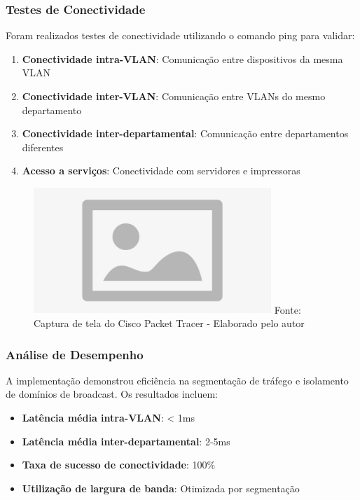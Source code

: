 \subsubsection{Testes de Conectividade}

Foram realizados testes de conectividade utilizando o comando ping para validar:

\begin{enumerate}
    \item \textbf{Conectividade intra-VLAN}: Comunicação entre dispositivos da mesma VLAN
    \item \textbf{Conectividade inter-VLAN}: Comunicação entre VLANs do mesmo departamento
    \item \textbf{Conectividade inter-departamental}: Comunicação entre departamentos diferentes
    \item \textbf{Acesso a serviços}: Conectividade com servidores e impressoras
\end{enumerate}

\begin{figure}[H]
\centering
{}
\includegraphics[width=0.8\textwidth]{figure/placeholder.jpg}
\label{fig:testes_conectividade}
{\fontsize{10pt}{\baselineskip}\selectfont
Fonte: Captura de tela do Cisco Packet Tracer - Elaborado pelo autor}
\end{figure}

\subsubsection{Análise de Desempenho}

A implementação demonstrou eficiência na segmentação de tráfego e isolamento de domínios de broadcast. Os resultados incluem:

\begin{itemize}
    \item \textbf{Latência média intra-VLAN}: < 1ms
    \item \textbf{Latência média inter-departamental}: 2-5ms
    \item \textbf{Taxa de sucesso de conectividade}: 100\%
    \item \textbf{Utilização de largura de banda}: Otimizada por segmentação
\end{itemize}

